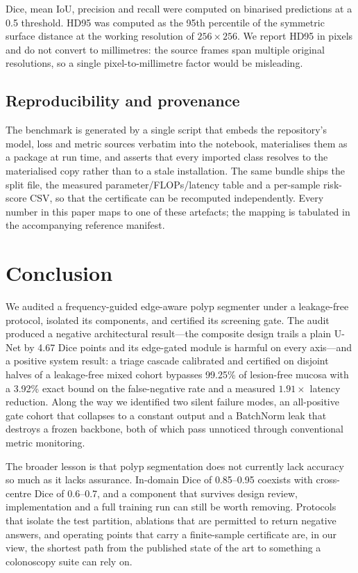 \documentclass[journal]{IEEEtran}
\begin{document}
Dice, mean IoU, precision and recall were computed on binarised predictions at a 0.5 threshold. HD95 was computed as the 95th percentile of the symmetric surface distance at the working resolution of $256\times256$. We report HD95 in pixels and do not convert to millimetres: the source frames span multiple original resolutions, so a single pixel-to-millimetre factor would be misleading.

\subsection{Reproducibility and provenance}

The benchmark is generated by a single script that embeds the repository's model, loss and metric sources verbatim into the notebook, materialises them as a package at run time, and asserts that every imported class resolves to the materialised copy rather than to a stale installation. The same bundle ships the split file, the measured parameter/FLOPs/latency table and a per-sample risk-score CSV, so that the certificate can be recomputed independently. Every number in this paper maps to one of these artefacts; the mapping is tabulated in the accompanying reference manifest.

\section{Conclusion}

We audited a frequency-guided edge-aware polyp segmenter under a leakage-free protocol, isolated its components, and certified its screening gate. The audit produced a negative architectural result---the composite design trails a plain U-Net by 4.67 Dice points and its edge-gated module is harmful on every axis---and a positive system result: a triage cascade calibrated and certified on disjoint halves of a leakage-free mixed cohort bypasses 99.25\% of lesion-free mucosa with a 3.92\% exact bound on the false-negative rate and a measured $1.91\times$ latency reduction. Along the way we identified two silent failure modes, an all-positive gate cohort that collapses to a constant output and a BatchNorm leak that destroys a frozen backbone, both of which pass unnoticed through conventional metric monitoring.

The broader lesson is that polyp segmentation does not currently lack accuracy so much as it lacks assurance. In-domain Dice of 0.85--0.95 coexists with cross-centre Dice of 0.6--0.7, and a component that survives design review, implementation and a full training run can still be worth removing. Protocols that isolate the test partition, ablations that are permitted to return negative answers, and operating points that carry a finite-sample certificate are, in our view, the shortest path from the published state of the art to something a colonoscopy suite can rely on.
\end{document}
